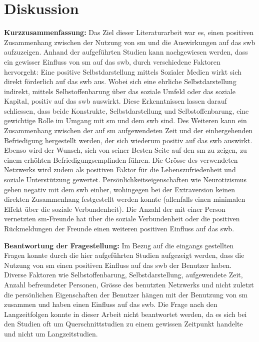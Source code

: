 \chapter{Diskussion}\label{chap.diskussion} 
\glsresetall
\textbf{Kurzzusammenfassung:}\newline
Das Ziel dieser Literaturarbeit war es, einen positiven Zusammenhang zwischen der Nutzung von \gls{sm} und die Auswirkungen auf das \gls{swb} aufzuzeigen. Anhand der aufgeführten Studien kann nachgewiesen werden, dass ein gewisser Einfluss von \gls{sm} auf das \gls{swb}, durch verschiedene Faktoren hervorgeht: Eine positive Selbstdarstellung mittels Sozialer Medien wirkt sich direkt förderlich auf das \gls{swb} aus. Wobei sich eine ehrliche Selbstdarstellung indirekt, mittels Selbstoffenbarung über das soziale Umfeld oder das soziale Kapital, positiv auf das \gls{swb} auswirkt. Diese Erkenntnissen lassen darauf schliessen, dass beide Konstrukte, Selbstdarstellung und Selbstoffenbarung, eine gewichtige Rolle im Umgang mit \gls{sm} und dem \gls{swb} sind. Des Weiteren kann ein Zusammenhang zwischen der auf \gls{sm} aufgewendeten Zeit und der einhergehenden Befriedigung hergestellt werden, der sich wiederum positiv auf das \gls{swb} auswirkt. Ebenso wird der Wunsch, sich von seiner Besten Seite auf den \gls{sm} zu zeigen, zu einem erhöhten Befriedigungsempfinden führen. Die Grösse des verwendeten Netzwerks wird zudem als positiven Faktor für die Lebenszufriedenheit und soziale Unterstützung gewertet. Persönlichkeitseigenschaften wie Neurotizismus gehen negativ mit dem \gls{swb} einher, wohingegen bei der Extraversion keinen direkten Zusammenhang festgestellt werden konnte (allenfalls einen minimalen Effekt über die soziale Verbundenheit). Die Anzahl der mit einer Person vernetzten \gls{sm}-Freunde hat über die soziale Verbundenheit oder die positiven Rückmeldungen der Freunde einen weiteren positiven Einfluss auf das \gls{swb}.\par 
\textbf{Beantwortung der Fragestellung:}\newline
Im Bezug auf die eingangs gestellten Fragen konnte durch die hier aufgeführten Studien aufgezeigt werden, dass die Nutzung von \gls{sm} einen positiven Einfluss auf das \gls{swb} der Benutzer haben. Diverse Faktoren wie Selbstoffenbarung, Selbstdarstellung, aufgewendete Zeit, Anzahl befreundeter Personen, Grösse des benutzten Netzwerks und nicht zuletzt die persönlichen Eigenschaften der Benutzer hängen mit der Benutzung von \gls{sm} zusammen und haben einen Einfluss auf das \gls{swb}. Die Frage nach den Langzeitfolgen konnte in dieser Arbeit nicht beantwortet werden, da es sich bei den Studien oft um Querschnittstudien zu einem gewissen Zeitpunkt handelte und nicht um Langzeitstudien. \par 
